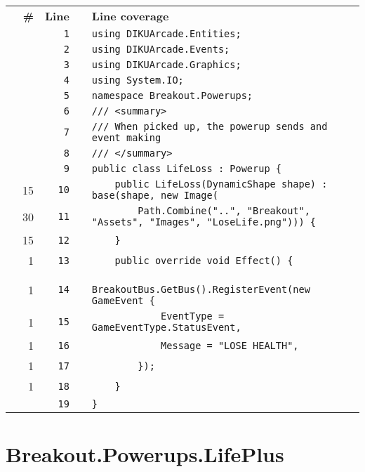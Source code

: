 \documentclass[a4paper,landscape,10pt]{article}
\begin{document}
\begin{longtable}[l]{lrrll}
\textbf{} & \textbf{\#} & \textbf{Line} & \textbf{} & \textbf{Line coverage}\\
\cellcolor{gray} &  & \verb~1~ & & \verb~using DIKUArcade.Entities;~\\
\cellcolor{gray} &  & \verb~2~ & & \verb~using DIKUArcade.Events;~\\
\cellcolor{gray} &  & \verb~3~ & & \verb~using DIKUArcade.Graphics;~\\
\cellcolor{gray} &  & \verb~4~ & & \verb~using System.IO;~\\
\cellcolor{gray} &  & \verb~5~ & & \verb~namespace Breakout.Powerups;~\\
\cellcolor{gray} &  & \verb~6~ & & \verb~/// <summary>~\\
\cellcolor{gray} &  & \verb~7~ & & \verb~/// When picked up, the powerup sends and event making~\\
\cellcolor{gray} &  & \verb~8~ & & \verb~/// </summary>~\\
\cellcolor{gray} &  & \verb~9~ & & \verb~public class LifeLoss : Powerup {~\\
\cellcolor{green} & 15 & \verb~10~ & & \verb~    public LifeLoss(DynamicShape shape) : base(shape, new Image(~\\
\cellcolor{green} & 30 & \verb~11~ & & \verb~        Path.Combine("..", "Breakout", "Assets", "Images", "LoseLife.png"))) {~\\
\cellcolor{green} & 15 & \verb~12~ & & \verb~    }~\\
\cellcolor{green} & 1 & \verb~13~ & & \verb~    public override void Effect() {~\\
\cellcolor{green} & 1 & \verb~14~ & & \verb~        BreakoutBus.GetBus().RegisterEvent(new GameEvent {~\\
\cellcolor{green} & 1 & \verb~15~ & & \verb~            EventType = GameEventType.StatusEvent,~\\
\cellcolor{green} & 1 & \verb~16~ & & \verb~            Message = "LOSE HEALTH",~\\
\cellcolor{green} & 1 & \verb~17~ & & \verb~        });~\\
\cellcolor{green} & 1 & \verb~18~ & & \verb~    }~\\
\cellcolor{gray} &  & \verb~19~ & & \verb~}~\\
\end{longtable}
\newpage
\section{Breakout.Powerups.LifePlus}
\end{document}
